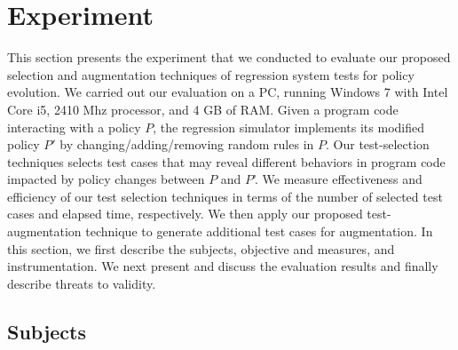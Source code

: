 % 		     
%


\section{Experiment}\label{sec:experiment}


This section presents the experiment that we conducted to evaluate our proposed
selection and augmentation techniques of regression system tests for policy
evolution. We carried out our evaluation on a PC, running Windows 7 with Intel Core i5, 2410 Mhz processor, and 4 GB of RAM. 
Given a program code interacting with a policy $P$, the regression simulator implements its modified
policy $P'$ by changing/adding/removing random rules in $P$.
Our test-selection techniques selects test cases that may reveal different behaviors in program code impacted
by policy changes between $P$ and $P$'.
We measure effectiveness and efficiency of our test selection
techniques in terms of the number of selected test cases and elapsed time, respectively.
We then apply our proposed test-augmentation technique to generate additional test cases
for augmentation.
In this section, we first describe the subjects, objective and measures, and instrumentation. We next present and discuss the evaluation results
and finally describe threats to validity.


\subsection{Subjects}

